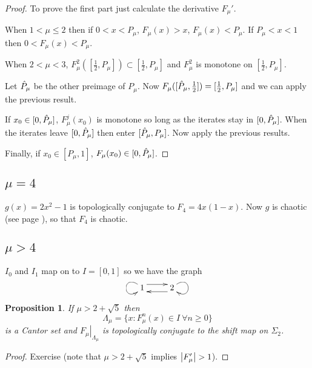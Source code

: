 \documentclass{notes}
\theoremstyle{plain}
\newtheorem{proposition}{Proposition}[chapter]
\begin{document}
\begin{proof}
To prove the first part just calculate the derivative $F_\mu'$.

When $1 < \mu \le 2$ then if $0 < x < P_\mu$, $F_\mu(x) > x$,
$F_\mu(x) < P_\mu$. If $P_\mu < x < 1$ then $0 < F_\mu(x) < P_\mu$.

\vspace{2in}

When $2 < \mu < 3$, $F^2_\mu([\tfrac{1}{2},P_\mu]) \subset
[\tfrac{1}{2},P_\mu]$ and $F^2_\mu$ is monotone on
$[\tfrac{1}{2},P_\mu]$.

Let $\Hat{P}_\mu$ be the other preimage of $P_\mu$.  Now
$F_\mu([\Hat{P}_\mu,\tfrac{1}{2}]) = [\tfrac{1}{2},P_\mu]$ and we can
apply the previous result.

If $x_0 \in [0,\Hat{P}_\mu]$, $F_\mu^j(x_0)$ is monotone so long as
the iterates stay in $[0,\Hat{P}_\mu]$.  When the iterates leave
$[0,\Hat{P}_\mu]$ then enter $[\Hat{P}_\mu,P_\mu]$.  Now apply the
previous results.

Finally, if $x_0 \in [P_\mu,1]$, $F_\mu(x_0) \in [0,\Hat{P}_\mu]$.
\end{proof}

\subsection{$\mu = 4$}

$g(x) = 2 x^2 - 1$ is topologically conjugate to $F_4 = 4 x(1-x)$.
Now $g$ is chaotic (see page \pageref{page:2x2m1}), so that
$F_4$ is chaotic.

\subsection{$\mu > 4$}

\vspace{1.5in}

$I_0$ and $I_1$ map on to $I = [0,1]$ so we have the graph
\[
\xymatrix{\ar @(ul,dl) 1 \ar@<1ex>[r] &
\ar@<1ex>[l] 2 \ar @(ur,dr)}
\]

\begin{proposition}\label{prop:fmu1}
If $\mu > 2 + \sqrt{5}$ then
\[
\Lambda_\mu = \{ x : F^n_\mu(x) \in I\ \forall n \ge 0 \}
\]
is a Cantor set and $\left. F_\mu \right|_{\Lambda_\mu}$ is
topologically conjugate to the shift map on $\Sigma_2$.
\end{proposition}

\begin{proof}
Exercise (note that $\mu > 2 + \sqrt{5}$ implies
$\left|F_\mu'\right| > 1$).
\end{proof}
\end{document}
